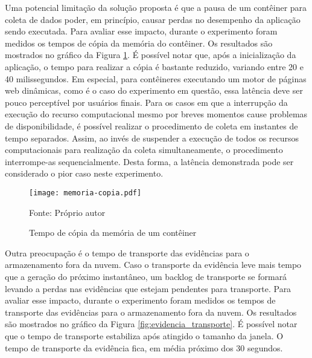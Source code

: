 %
%
%

Uma potencial limitação da solução proposta é que a pausa de um contêiner para coleta de dados poder, em princípio, causar perdas no desempenho da aplicação sendo executada. 
%
Para avaliar esse impacto, durante o experimento foram medidos os tempos de cópia da memória do contêiner.
%
Os resultados são mostrados no gráfico da Figura \ref{fig:memoria-copia}.
%
É possível notar que, após a inicialização da aplicação, o tempo para realizar a cópia é bastante reduzido, variando entre 20 e 40 milissegundos. 
%
Em especial, para contêineres executando um motor de páginas web dinâmicas, como é o caso do experimento em questão, essa latência deve ser pouco perceptível por usuários finais.
%
Para os casos em que a interrupção da execução do recurso computacional mesmo por breves momentos cause problemas de disponibilidade, é possível realizar o procedimento de coleta em instantes de tempo separados.
%
Assim, ao invés de suspender a execução de todos os recursos computacionais para realização da coleta simultaneamente, o procedimento interrompe-as sequencialmente.
%
Desta forma, a latência demonstrada pode ser considerado o pior caso neste experimento.

\begin{figure}[htb!]
\footnotesize
\caption{Tempo de cópia da memória de um contêiner}
\texttt{[image: memoria-copia.pdf]}
\centering
\label{fig:memoria-copia}
\begin{center}
Fonte: Próprio autor 
\end{center}
\end{figure}


Outra preocupação é o tempo de transporte das evidências para o armazenamento fora da nuvem.
%
Caso o transporte da evidência leve mais tempo que a geração do próximo instantâneo, um backlog de transporte se formará levando a perdas nas evidências que estejam pendentes para transporte.
%
Para avaliar esse impacto, durante o experimento foram medidos os tempos de transporte das evidências para o armazenamento fora da nuvem.
%
Os resultados são mostrados no gráfico da Figura \ref{fig:evidencia_transporte}.
%
É possível notar que o tempo de transporte estabiliza após atingido o tamanho da janela. O tempo de transporte da evidência fica, em média próximo dos 30 segundos. 

